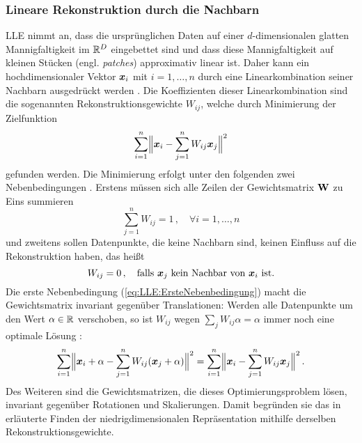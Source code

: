 \subsubsection{Lineare Rekonstruktion durch die Nachbarn}
\label{ch:MethodenDerDimRed:statistisch:LLE:LineareRekonstruktion}
LLE nimmt an, dass die ursprünglichen Daten auf einer $d$-dimensionalen glatten Mannigfaltigkeit im $\real^D$ eingebettet sind und dass diese Mannigfaltigkeit auf kleinen Stücken (engl. \textit{patches}) approximativ linear ist. Daher kann ein hochdimensionaler Vektor $\vect{x}_i$ mit $i = 1,\ldots,n$ durch eine Linearkombination seiner Nachbarn
ausgedrückt werden \parencite[2323]{Roweis.2000}. Die Koeffizienten dieser Linearkombination sind die sogenannten
Rekonstruktionsgewichte $W_{ij}$, welche durch Minimierung der Zielfunktion
\begin{equation}
	\label{eq:LLE:Zielfunktion}
	\sum_{i = 1}^n \norm[\Big]{ \vect{x}_i - \sum_{j = 1}^n W_{ij}\vect{x}_j}^2
\end{equation}
gefunden werden. Die Minimierung erfolgt unter den folgenden zwei Nebenbedingungen \parencite[2]{Roweis.2000}. Erstens müssen sich alle Zeilen der Gewichtsmatrix $\mat{W}$ zu Eins
summieren
\begin{equation}
	\label{eq:LLE:ErsteNebenbedingung}
	\sum_{j = 1}^nW_{ij} = 1 \, , \quad \forall i = 1, \ldots, n
\end{equation}
und zweitens sollen Datenpunkte, die keine Nachbarn sind, keinen Einfluss auf die Rekonstruktion haben, das heißt
\begin{equation}
	\label{eq:LLE:ZweiteNebenbedingung}
	W_{ij} = 0 \, , \quad \text{falls } \vect{x}_j \text{ kein Nachbar von } \vect{x}_i \text{ ist.}
\end{equation}
Die erste Nebenbedingung (\eqref{eq:LLE:ErsteNebenbedingung}) macht die Gewichtsmatrix invariant gegenüber Translationen: Werden alle Datenpunkte um den Wert $\alpha \in \real$ verschoben, so ist $W_{ij}$ wegen $\sum_j W_{ij}\alpha = \alpha$ immer noch eine optimale Lösung \parencite[8]{Cayton.2005}:
\begin{equation}
	\sum_{i = 1}^n \norm[\Big]{ \vect{x}_i + \alpha - \sum_{j = 1}^n W_{ij}(\vect{x}_j + \alpha)}^2 = \sum_{i = 1}^n \norm[\Big]{ \vect{x}_i - \sum_{j = 1}^n W_{ij}\vect{x}_j}^2 \, .
\end{equation}
Des Weiteren sind die Gewichtsmatrizen, die dieses Optimierungsproblem lösen, invariant gegenüber Rotationen und Skalierungen. Damit begründen sie das in  erläuterte Finden der niedrigdimensionalen Repräsentation mithilfe derselben Rekonstruktionsgewichte.

